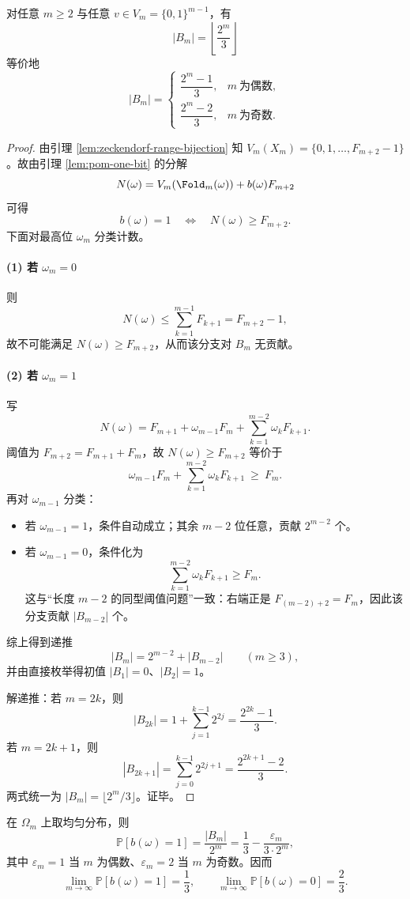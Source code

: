 \begin{theorem}[一步可判别与右解析性]\label{thm:pom-right-resolving}
对任意 $m\ge 2$ 与任意 $v\in V_m=\{0,1\}^{m-1}$，有
$$
\boxed{\ |B_m|=\left\lfloor \frac{2^m}{3}\right\rfloor\ }
$$
等价地
$$
|B_m|=
\begin{cases}
\dfrac{2^m-1}{3}, & m\ \text{为偶数},\\[6pt]
\dfrac{2^m-2}{3}, & m\ \text{为奇数}.
\end{cases}
$$
\end{theorem}
\begin{proof}
由引理 \ref{lem:zeckendorf-range-bijection} 知 $V_m(X_m)=\{0,1,\dots,F_{m+2}-1\}$。故由引理 \ref{lem:pom-one-bit} 的分解
$$
N(\omega)=V_m(\Fold_m(\omega))+b(\omega)F_{m+2}
$$
可得
$$
b(\omega)=1\quad\Longleftrightarrow\quad N(\omega)\ge F_{m+2}.
$$
下面对最高位 $\omega_m$ 分类计数。

\paragraph{(1) 若 $\omega_m=0$}
则
$$
N(\omega)\le \sum_{k=1}^{m-1}F_{k+1}=F_{m+2}-1,
$$
故不可能满足 $N(\omega)\ge F_{m+2}$，从而该分支对 $B_m$ 无贡献。

\paragraph{(2) 若 $\omega_m=1$}
写
$$
N(\omega)=F_{m+1}+\omega_{m-1}F_m+\sum_{k=1}^{m-2}\omega_kF_{k+1}.
$$
阈值为 $F_{m+2}=F_{m+1}+F_m$，故 $N(\omega)\ge F_{m+2}$ 等价于
$$
\omega_{m-1}F_m+\sum_{k=1}^{m-2}\omega_kF_{k+1}\ \ge\ F_m.
$$
再对 $\omega_{m-1}$ 分类：
\begin{itemize}
  \item 若 $\omega_{m-1}=1$，条件自动成立；其余 $m-2$ 位任意，贡献 $2^{m-2}$ 个。
  \item 若 $\omega_{m-1}=0$，条件化为
  $$
  \sum_{k=1}^{m-2}\omega_kF_{k+1}\ge F_m.
  $$
  这与“长度 $m-2$ 的同型阈值问题”一致：右端正是 $F_{(m-2)+2}=F_m$，因此该分支贡献 $|B_{m-2}|$ 个。
\end{itemize}
综上得到递推
$$
|B_m|=2^{m-2}+|B_{m-2}|\qquad(m\ge 3),
$$
并由直接枚举得初值 $|B_1|=0$、$|B_2|=1$。

解递推：若 $m=2k$，则
$$
|B_{2k}|=1+\sum_{j=1}^{k-1}2^{2j}=\frac{2^{2k}-1}{3}.
$$
若 $m=2k+1$，则
$$
|B_{2k+1}|=\sum_{j=0}^{k-1}2^{2j+1}=\frac{2^{2k+1}-2}{3}.
$$
两式统一为 $|B_m|=\lfloor 2^m/3\rfloor$。证毕。
\end{proof}

\begin{corollary}\label{cor:pom-hidden-bit-entropy}
在 $\Omega_m$ 上取均匀分布，则
$$
\mathbb{P}[b(\omega)=1]=\frac{|B_m|}{2^m}
=\frac{1}{3}-\frac{\varepsilon_m}{3\cdot 2^m},
$$
其中 $\varepsilon_m=1$ 当 $m$ 为偶数、$\varepsilon_m=2$ 当 $m$ 为奇数。因而
$$
\lim_{m\to\infty}\mathbb{P}[b(\omega)=1]=\frac{1}{3},\qquad
\lim_{m\to\infty}\mathbb{P}[b(\omega)=0]=\frac{2}{3}.
$$
\end{corollary}

